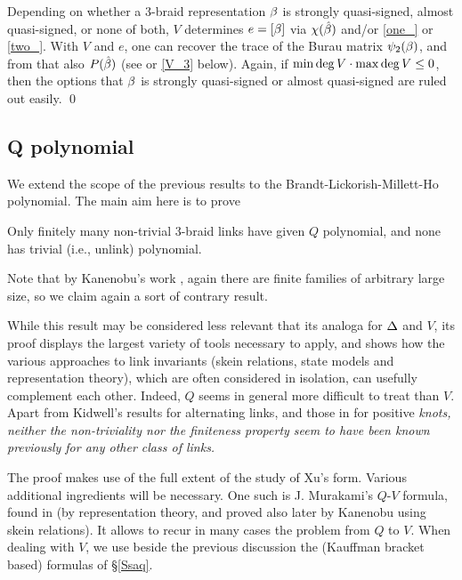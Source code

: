 Depending on whether a 3-braid representation $\beta$ is strongly
quasi-signed, almost quasi-signed, or none of both, $V$ determines
$e=[\beta]$ via $\chi(\hat{\beta})$ and/or \eqref{one_} or \eqref{two_}.
With $V$ and $e$, one can recover the trace of the Burau matrix
$\psi_2(\beta)$, and from that also $P(\hat{\beta})$ (see \cite{Birman} or
\eqref{V_3} below). Again, if $\min\deg V\cdot \max\deg V\le 0$, then the
options that $\beta$ is strongly quasi-signed or almost quasi-signed
are ruled out easily. \qed

\subsection{Q polynomial}

We extend the scope of the previous results to the
Brandt-Lickorish-Millett-Ho polynomial. The main aim here is to prove

\begin{theo}\label{thQ}
Only finitely many non-trivial 3-braid links have given $Q$
polynomial, and none has trivial (i.e., unlink) polynomial.
\end{theo}

Note that by Kanenobu's work \cite{Kanenobu3}, again
there are finite families of arbitrary large size,
so we claim again a sort of contrary result.

While this result may be considered less relevant
that its analoga for $\Delta$ and $V$, its proof displays
the largest variety of tools necessary to apply, and 
shows how the various approaches to link invariants
(skein relations, state models and representation theory), 
which are often considered in isolation, can usefully 
complement each other. Indeed, $Q$ seems in general 
more difficult to treat than $V$. Apart from Kidwell's 
results \cite{Kidwell} for alternating links, and those
in \cite{pos} for positive \em{knots}, neither the 
non-triviality nor the finiteness property seem to have 
been known previously for any other class of links.

The proof makes use of the full extent of the study of 
Xu's form. Various additional ingredients will be necessary.
One such is J. Murakami's $Q$-$V$ formula, found in
\cite{Murakami} (by representation theory, and proved also
later by Kanenobu \cite{Kanenobu} using skein relations).
It allows to recur in many cases the problem from $Q$ to $V$.
When dealing with $V$, we use beside the previous discussion
the (Kauffman bracket based) formulas of \S\ref{Ssaq}.

